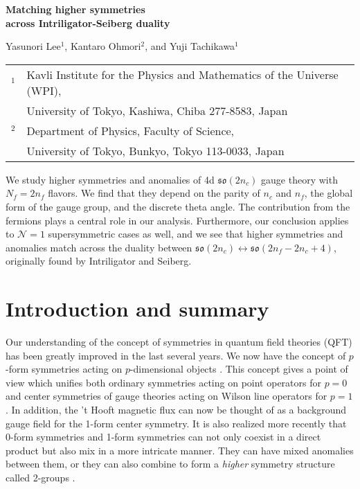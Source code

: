 \documentclass[12pt]{article}
\numberwithin{equation}{section}
\def\Nequals#1{$\mathcal{N}{=}#1$}
\def\so{\mathfrak{so}}
\begin{document}
\begin{titlepage}

\begin{flushright}
\end{flushright}

\vskip 3cm

\begin{center}

{\Large \bfseries Matching higher symmetries\\[.8em]
across Intriligator-Seiberg duality}

\vskip 1cm
Yasunori Lee$^1$, Kantaro Ohmori$^2$, and Yuji Tachikawa$^1$
\vskip 1cm

\begin{tabular}{ll}
$^1$ & Kavli Institute for the Physics and Mathematics of the Universe (WPI), \\
& University of Tokyo,  Kashiwa, Chiba 277-8583, Japan\\
$^2$ & Department of Physics, Faculty of Science, \\
& University of Tokyo, Bunkyo, Tokyo 113-0033, Japan
\end{tabular}

\vskip 1cm

\end{center}


\noindent
We study higher symmetries and anomalies of 4d  $\so(2n_c)$ gauge theory with $N_f=2n_f$ flavors.
We find that they depend on the parity of $n_c$ and $n_f$,
the global form of the gauge group, and the discrete theta angle.
The contribution from the fermions plays a central role in our analysis.
Furthermore, our conclusion applies to \Nequals1 supersymmetric cases as well, and
we see that higher symmetries and anomalies match across the duality between
$\so(2n_c)\leftrightarrow\so(2n_f-2n_c+4)$, originally found by Intriligator and Seiberg.


\end{titlepage}

\setcounter{tocdepth}{2}
\tableofcontents

\section{Introduction and summary}
\label{sec:introduction}
Our understanding of the concept of symmetries in quantum field theories (QFT) has been greatly improved in the last several years.
We now have the concept of $p$-form symmetries acting on $p$-dimensional objects \cite{Gaiotto:2014kfa}.
This concept  gives a point of view which unifies both
ordinary symmetries acting on point operators for $p=0$
and center symmetries of gauge theories acting on Wilson line operators for $p=1$.
In addition, the 't Hooft magnetic flux \cite{tHooft:1979rtg} can now be thought of as a background gauge field for the 1-form center symmetry.
It is also realized more recently that 0-form symmetries and 1-form symmetries can not only coexist in a direct product but also mix in a more intricate manner.
They can have mixed anomalies between them,
or they can also combine to form a \textit{higher} symmetry structure called 2-groups \cite{Cordova:2018cvg,Benini:2018reh}.
\end{document}
